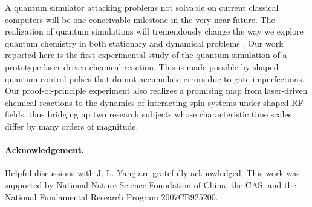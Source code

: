 \documentclass[prl,twocolumn,showpacs]{revtex4}
\begin{document}
   A quantum simulator attacking problems not solvable on current classical computers will be one conceivable milestone in the very near future. The realization of quantum simulations will tremendously change the way we explore quantum chemistry in both stationary and dynamical problems \cite{static,dynamical}.   %
  Our work reported here is the first experimental study of the quantum simulation of a prototype laser-driven chemical reaction. This is made possible by shaped quantum control pulses that do not accumulate errors due to gate imperfections.
Our proof-of-principle experiment also realizes a promising map from laser-driven chemical reactions to the dynamics of interacting spin systems under shaped RF fields, thus bridging up two research subjects whose characteristic time scales differ by many orders of magnitude.




\paragraph*{Acknowledgement.}

Helpful discussions with J. L. Yang are gratefully acknowledged.
This work was supported by National Nature Science Foundation of China, the CAS, and the National Fundamental Research Program 2007CB925200.
\end{document}
